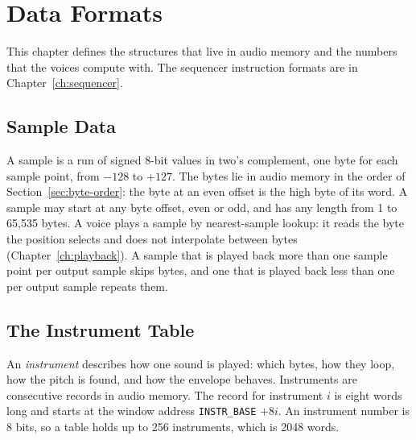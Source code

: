 \chapter{Data Formats}
\label{ch:formats}

This chapter defines the structures that live in audio memory and the numbers that the voices compute with. The
sequencer instruction formats are in Chapter~\ref{ch:sequencer}.

\section{Sample Data}
\label{sec:sample-data}

A sample is a run of signed 8-bit values in two's complement, one byte for each sample point, from $-128$ to $+127$.
The bytes lie in audio memory in the order of Section~\ref{sec:byte-order}: the byte at an even offset is the high byte
of its word. A sample may start at any byte offset, even or odd, and has any length from 1 to 65,535 bytes. A voice
plays a sample by nearest-sample lookup: it reads the byte the position selects and does not interpolate between bytes
(Chapter~\ref{ch:playback}). A sample that is played back more than one sample point per output sample skips bytes, and
one that is played back less than one per output sample repeats them.

\section{The Instrument Table}
\label{sec:instrument-table}

An \emph{instrument} describes how one sound is played: which bytes, how they loop, how the pitch is found, and how the
envelope behaves. Instruments are consecutive records in audio memory. The record for instrument $i$ is eight words
long and starts at the window address \texttt{INSTR\_BASE} $+ 8i$. An instrument number is 8 bits, so a table holds up
to 256 instruments, which is 2048 words.

